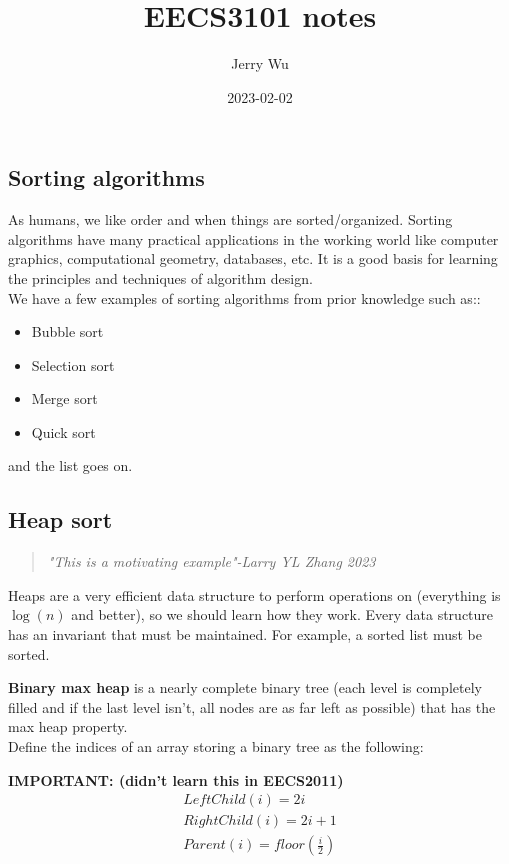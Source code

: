 \documentclass[12pt]{article}
\title{EECS3101 notes}
\author{Jerry Wu}
\date{2023-02-02}
\begin{document}
\maketitle
\subsection*{Sorting algorithms}
As humans, we like order and when things are sorted/organized. Sorting algorithms have many practical applications in the working world like computer graphics, computational geometry, databases, etc. It is a good basis for learning the principles and techniques of algorithm design.\\We have a few examples of sorting algorithms from prior knowledge such as::

\begin{itemize}
    \item Bubble sort
    \item Selection sort
    \item Merge sort
    \item Quick sort
\end{itemize}

and the list goes on.

\subsection*{Heap sort}
\begin{quote}
    \textit{"This is a motivating example"-Larry YL Zhang 2023}
\end{quote}

Heaps are a very efficient data structure to perform operations on (everything is $\log(n)$ and better), so we should learn how they work. Every data structure has an invariant that must be maintained. For example, a sorted list must be sorted.

\textbf{Binary max heap} is a nearly complete binary tree (each level is completely filled and if the last level isn't, all nodes are as far left as possible) that has the max heap property.\\
Define the indices of an array storing a binary tree as the following:

\textbf{IMPORTANT: (didn't learn this in EECS2011)}
\begin{align*}
    LeftChild(i)=2i\\
    RightChild(i)=2i+1\\
    Parent(i)=floor(\frac
    {i}{2})
\end{align*}
\end{document}
